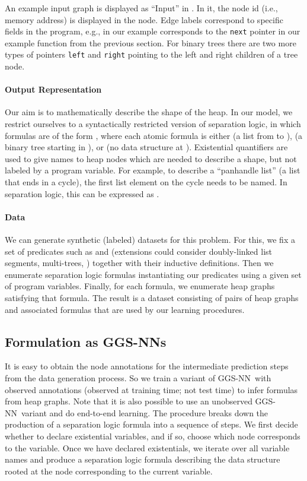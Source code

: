 \documentclass{article} \usepackage{iclr2016_conference,times}
\newcommand{\OurMethodShort}{GGS-NN}
\newcommand{\OurMethodShorts}{\OurMethodShort s}
\begin{document}
An example input graph is displayed as ``Input'' in .
In it, the node id (i.e., memory address) is displayed in the node.
Edge labels correspond to specific fields in the program, e.g.,  in our
example corresponds to the \texttt{next} pointer in our example function from
the previous section. For binary trees there are two more types
of pointers \texttt{left} and \texttt{right} pointing to the left and right
children of a tree node.



\paragraph{Output Representation}
Our aim is to mathematically describe the shape of the heap.
In our model, we restrict ourselves to a syntactically restricted version of
separation logic, in which formulas are of the form
 ,
where each atomic formula  is either  (a list from  to ),
 (a binary tree starting in ), or  (no data
structure at ).
Existential quantifiers are used to give names to heap nodes which are
needed to describe a shape, but not labeled by a program variable.
For example, to describe a ``panhandle list'' (a list that ends in a
cycle), the first list element on the cycle needs to be named.
In separation logic, this can be expressed as .

\paragraph{Data}
We can generate synthetic (labeled) datasets for this problem.
For this, we fix a set of predicates such as  and  (extensions
could consider doubly-linked list segments, multi-trees, ) together with
their inductive definitions.
Then we enumerate separation logic
formulas instantiating our predicates using a given set of program variables.
Finally,
for each formula, we enumerate heap graphs satisfying that
formula. The result is a dataset consisting of pairs of heap graphs and
associated formulas that are used by our learning
procedures.


\subsection{Formulation as \OurMethodShorts}

It is easy to obtain
the node annotations for the intermediate prediction steps from the data
generation process. So we train a variant of
\OurMethodShort~with observed annotations (observed at training time; not test time)
to infer formulas from heap graphs.
Note that it is also possible to use an unobserved
\OurMethodShort~variant and do end-to-end learning. The procedure breaks down
the production of a separation logic formula into a sequence of
steps. We first decide whether to declare existential variables, and if so,
choose which node corresponds to the variable.
Once we have declared existentials, we iterate over all variable names
and produce a separation logic formula describing the data
structure rooted at the node corresponding to the current variable.
\end{document}
